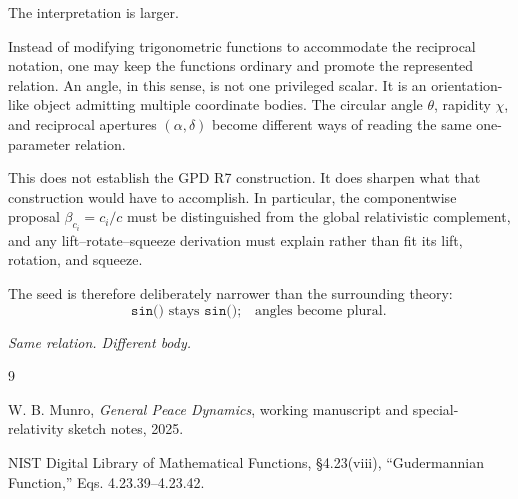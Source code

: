 \documentclass[11pt]{article}
\begin{document}
The interpretation is larger.

Instead of modifying trigonometric functions to accommodate the reciprocal
notation, one may keep the functions ordinary and promote the represented
relation. An angle, in this sense, is not one privileged scalar. It is an
orientation-like object admitting multiple coordinate bodies. The circular
angle $\theta$, rapidity $\chi$, and reciprocal apertures $(\alpha,\delta)$
become different ways of reading the same one-parameter relation.

This does not establish the GPD R7 construction. It does sharpen what that
construction would have to accomplish. In particular, the componentwise
proposal $\beta_{c_i}=c_i/c$ must be distinguished from the global
relativistic complement, and any lift--rotate--squeeze derivation must explain
rather than fit its lift, rotation, and squeeze.

The seed is therefore deliberately narrower than the surrounding theory:
\begin{equation}
\boxed{
\texttt{sin()}\text{ stays }\texttt{sin()};\quad
\text{angles become plural.}
}
\end{equation}

\begin{center}
\emph{Same relation. Different body.}
\end{center}

\begin{thebibliography}{9}

W. B. Munro,
\emph{General Peace Dynamics},
working manuscript and special-relativity sketch notes, 2025.

NIST Digital Library of Mathematical Functions,
\S 4.23(viii), ``Gudermannian Function,''
Eqs. 4.23.39--4.23.42.

\end{thebibliography}
\end{document}
